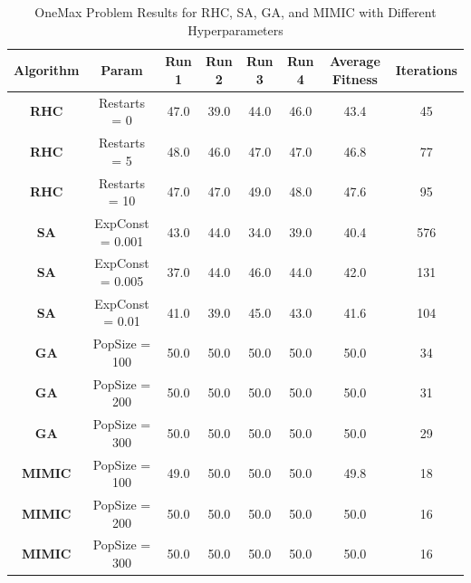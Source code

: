 \begin{table}[h!]
    \centering
    \caption{OneMax Problem Results for RHC, SA, GA, and MIMIC with Different Hyperparameters}
    \begin{tabular}{|c|c|c|c|c|c|c|c|}
        \hline
        \textbf{Algorithm} & \textbf{Param} & \textbf{Run 1} & \textbf{Run 2} & \textbf{Run 3} & \textbf{Run 4} & \textbf{Average Fitness} & \textbf{Iterations} \\ \hline
        
        \textbf{RHC} & Restarts = 0 & 47.0 & 39.0 & 44.0 & 46.0 & 43.4 & 45 \\ \hline
        \textbf{RHC} & Restarts = 5 & 48.0 & 46.0 & 47.0 & 47.0 & 46.8 & 77 \\ \hline
        \textbf{RHC} & Restarts = 10 & 47.0 & 47.0 & 49.0 & 48.0 & 47.6 & 95 \\ \hline
        
        \textbf{SA} & ExpConst = 0.001 & 43.0 & 44.0 & 34.0 & 39.0 & 40.4 & 576 \\ \hline
        \textbf{SA} & ExpConst = 0.005 & 37.0 & 44.0 & 46.0 & 44.0 & 42.0 & 131 \\ \hline
        \textbf{SA} & ExpConst = 0.01 & 41.0 & 39.0 & 45.0 & 43.0 & 41.6 & 104 \\ \hline
        
        \textbf{GA} & PopSize = 100 & 50.0 & 50.0 & 50.0 & 50.0 & 50.0 & 34 \\ \hline
        \textbf{GA} & PopSize = 200 & 50.0 & 50.0 & 50.0 & 50.0 & 50.0 & 31 \\ \hline
        \textbf{GA} & PopSize = 300 & 50.0 & 50.0 & 50.0 & 50.0 & 50.0 & 29 \\ \hline
        
        \textbf{MIMIC} & PopSize = 100 & 49.0 & 50.0 & 50.0 & 50.0 & 49.8 & 18 \\ \hline
        \textbf{MIMIC} & PopSize = 200 & 50.0 & 50.0 & 50.0 & 50.0 & 50.0 & 16 \\ \hline
        \textbf{MIMIC} & PopSize = 300 & 50.0 & 50.0 & 50.0 & 50.0 & 50.0 & 16 \\ \hline
        
    \end{tabular}
    \label{tab:onemax_results}
\end{table}
